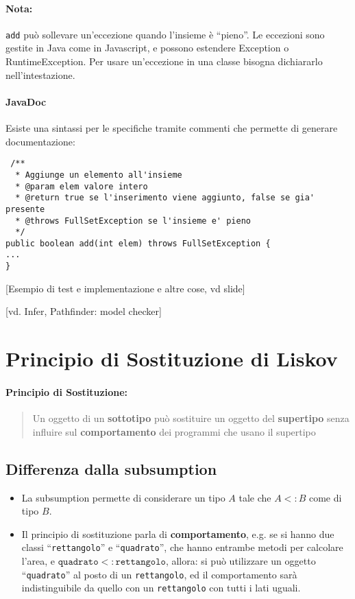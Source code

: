 \documentclass[a4paper,10pt]{article}
\begin{document}
\paragraph{Nota:} \texttt{add} può sollevare un'eccezione quando l'insieme è ``pieno''. Le eccezioni sono gestite in Java come in Javascript, e possono estendere Exception o RuntimeException. Per usare un'eccezione in una classe bisogna dichiararlo nell'intestazione.


\paragraph{JavaDoc}
Esiste una sintassi per le specifiche tramite commenti che permette di generare documentazione:

\begin{lstlisting}
 /**
  * Aggiunge un elemento all'insieme
  * @param elem valore intero
  * @return true se l'inserimento viene aggiunto, false se gia' presente
  * @throws FullSetException se l'insieme e' pieno
  */
public boolean add(int elem) throws FullSetException {
...
}
\end{lstlisting}


\newpage

[Esempio di test e implementazione e altre cose, vd slide]

[vd. Infer, Pathfinder: model checker]

\section{Principio di Sostituzione di Liskov}
\paragraph{Principio di Sostituzione:}
\begin{quote}
 Un oggetto di un \textbf{sottotipo} può sostituire un oggetto del \textbf{supertipo} senza influire sul \textbf{comportamento} dei programmi che usano il supertipo
\end{quote}

\subsection{Differenza dalla subsumption}
\begin{itemize}
 \item La subsumption permette di considerare un tipo $A$ tale che $A <: B$ come di tipo $B$.
 \item Il principio di sostituzione parla di \textbf{comportamento}, e.g. se si hanno due classi ``\texttt{rettangolo}'' e ``\texttt{quadrato}'', che hanno entrambe metodi per calcolare l'area, e $\texttt{quadrato} <: \texttt{rettangolo}$, allora: si può utilizzare un oggetto ``\texttt{quadrato}'' al posto di un \texttt{rettangolo}, ed il comportamento sarà indistinguibile da quello con un \texttt{rettangolo} con tutti i lati uguali.
\end{itemize}
\end{document}
